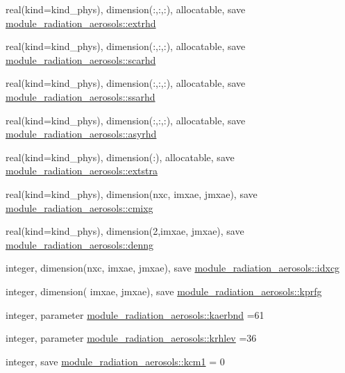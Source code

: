 \begin{DoxyCompactItemize}
\item 
real(kind=kind\+\_\+phys), dimension(\+:,\+:,\+:), allocatable, save \hyperlink{namespacemodule__radiation__aerosols_a1c69f7b8ff0c98252e94def83dabfed4}{module\+\_\+radiation\+\_\+aerosols\+::extrhd}
\item 
real(kind=kind\+\_\+phys), dimension(\+:,\+:,\+:), allocatable, save \hyperlink{namespacemodule__radiation__aerosols_a859ba893a7b0b727ce02f3f29906a0a6}{module\+\_\+radiation\+\_\+aerosols\+::scarhd}
\item 
real(kind=kind\+\_\+phys), dimension(\+:,\+:,\+:), allocatable, save \hyperlink{namespacemodule__radiation__aerosols_ac0714d386ee3dc2ca7f6692905566274}{module\+\_\+radiation\+\_\+aerosols\+::ssarhd}
\item 
real(kind=kind\+\_\+phys), dimension(\+:,\+:,\+:), allocatable, save \hyperlink{namespacemodule__radiation__aerosols_a090d37e62ba333db64e28bf89e89a08d}{module\+\_\+radiation\+\_\+aerosols\+::asyrhd}
\item 
real(kind=kind\+\_\+phys), dimension(\+:), allocatable, save \hyperlink{namespacemodule__radiation__aerosols_ac0c59f22f472671cd86221cc1ed46c60}{module\+\_\+radiation\+\_\+aerosols\+::extstra}
\item 
real(kind=kind\+\_\+phys), dimension(nxc, imxae, jmxae), save \hyperlink{namespacemodule__radiation__aerosols_a358c83599fb321a59c958e54d9f284d9}{module\+\_\+radiation\+\_\+aerosols\+::cmixg}
\item 
real(kind=kind\+\_\+phys), dimension(2,imxae, jmxae), save \hyperlink{namespacemodule__radiation__aerosols_a0ccc698bc870cb6ccbc1c2b64a3f45f6}{module\+\_\+radiation\+\_\+aerosols\+::denng}
\item 
integer, dimension(nxc, imxae, jmxae), save \hyperlink{namespacemodule__radiation__aerosols_a4cb38abaf6ece5a0ed717edd6f6b4078}{module\+\_\+radiation\+\_\+aerosols\+::idxcg}
\item 
integer, dimension(     imxae, jmxae), save \hyperlink{namespacemodule__radiation__aerosols_a28df10ba381278cc7474bea0bfdaa870}{module\+\_\+radiation\+\_\+aerosols\+::kprfg}
\item 
integer, parameter \hyperlink{namespacemodule__radiation__aerosols_ad345c77fc29d8b02de34990162645a66}{module\+\_\+radiation\+\_\+aerosols\+::kaerbnd} =61
\item 
integer, parameter \hyperlink{namespacemodule__radiation__aerosols_a33f2d4489a1730a27cbdc2e2add0f977}{module\+\_\+radiation\+\_\+aerosols\+::krhlev} =36
\item 
integer, save \hyperlink{namespacemodule__radiation__aerosols_a92b09dd26cc321af3b5da0b1c310a588}{module\+\_\+radiation\+\_\+aerosols\+::kcm1} = 0

\end{DoxyCompactItemize}
